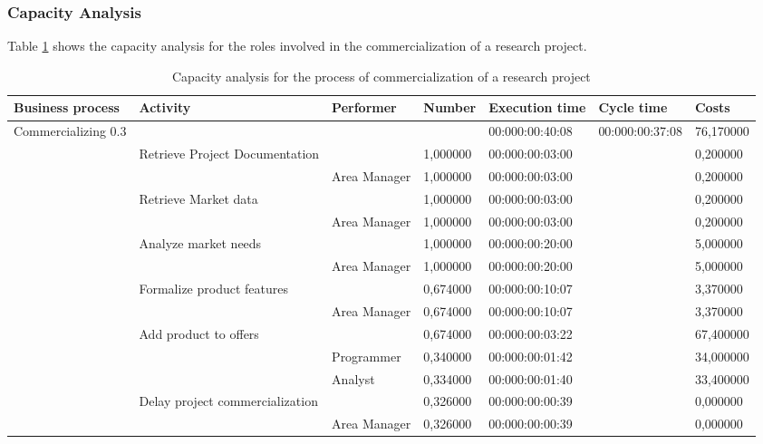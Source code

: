 \subsubsection{Capacity Analysis}
Table \ref{2tab:commerc} shows the capacity analysis for the roles involved in
the commercialization of a research project.
\begin{landscape}
\centering
\begin{table}
{\tiny
\begin{tabular}{|l|l|l|l|l|l|l|}
Business process&Activity&Performer&Number&Execution time&Cycle
time&Costs\\
\hline
Commercializing 0.3&&&&00:000:00:40:08&00:000:00:37:08&76,170000\\
\hline
&Retrieve Project Documentation &&1,000000&00:000:00:03:00&&0,200000\\
\hline
&&Area Manager &1,000000&00:000:00:03:00&&0,200000\\
\hline
&Retrieve Market data &&1,000000&00:000:00:03:00&&0,200000\\
\hline
&&Area Manager &1,000000&00:000:00:03:00&&0,200000\\
\hline
&Analyze market needs &&1,000000&00:000:00:20:00&&5,000000\\
\hline
&&Area Manager &1,000000&00:000:00:20:00&&5,000000\\
\hline
&Formalize product features &&0,674000&00:000:00:10:07&&3,370000\\
\hline
&&Area Manager &0,674000&00:000:00:10:07&&3,370000\\
\hline
&Add product to offers &&0,674000&00:000:00:03:22&&67,400000\\
\hline
&&Programmer &0,340000&00:000:00:01:42&&34,000000\\
\hline
&&Analyst &0,334000&00:000:00:01:40&&33,400000\\
\hline
&Delay project commercialization &&0,326000&00:000:00:00:39&&0,000000\\
\hline
&&Area Manager &0,326000&00:000:00:00:39&&0,000000\\
\hline
\end{tabular}
}
\caption{Capacity analysis for the process of commercialization of a
research project}
\label{2tab:commerc}
\end{table}
\end{landscape}



